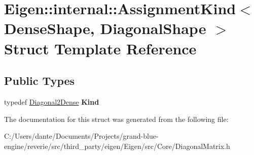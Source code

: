 \hypertarget{struct_eigen_1_1internal_1_1_assignment_kind_3_01_dense_shape_00_01_diagonal_shape_01_4}{}\section{Eigen\+::internal\+::Assignment\+Kind$<$ Dense\+Shape, Diagonal\+Shape $>$ Struct Template Reference}
\label{struct_eigen_1_1internal_1_1_assignment_kind_3_01_dense_shape_00_01_diagonal_shape_01_4}
\subsection*{Public Types}
\begin{DoxyCompactItemize}
\item 
\mbox{\label{struct_eigen_1_1internal_1_1_assignment_kind_3_01_dense_shape_00_01_diagonal_shape_01_4_a37ad5764b16d3d88e2f84737be93c88a}} 
typedef \mbox{\hyperlink{struct_eigen_1_1internal_1_1_diagonal2_dense}{Diagonal2\+Dense}} {\bfseries Kind}
\end{DoxyCompactItemize}


The documentation for this struct was generated from the following file\+:\begin{DoxyCompactItemize}
\item 
C\+:/\+Users/dante/\+Documents/\+Projects/grand-\/blue-\/engine/reverie/src/third\+\_\+party/eigen/\+Eigen/src/\+Core/Diagonal\+Matrix.\+h\end{DoxyCompactItemize}
